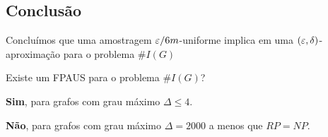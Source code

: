 \subsection{Conclusão}
Concluímos que uma amostragem $\varepsilon/6m$-uniforme implica em uma
$(\varepsilon, \delta)$-aproximação para o problema $\#I(G)$

\begin{pergunta}
Existe um FPAUS para o problema $\#I(G)$?
\end{pergunta}

\textbf{Sim}, para grafos com grau máximo $\Delta \leq 4$.

\textbf{Não}, para grafos com grau máximo $\Delta = 2000$ a menos que $RP = NP$.
